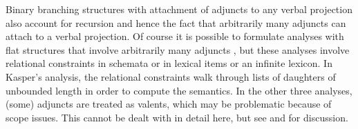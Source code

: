 \documentclass[output=paper]{langsci/langscibook}
\begin{document}
Binary branching structures with attachment of adjuncts to any verbal projection also account for recursion and hence the
fact that arbitrarily many adjuncts can attach to a verbal projection.
Of course it is possible to formulate analyses with flat structures that involve arbitrarily many
adjuncts \citep{Kasper94a,Noord94,AG2000a,BMS2001a}, but these analyses involve relational
constraints in schemata or in lexical items or an infinite lexicon. In Kasper's analysis, the
relational constraints walk through lists of daughters of unbounded length in order to compute the
semantics. In the other three analyses, (some) adjuncts are treated as valents, which may be problematic
because of scope issues. This cannot be dealt with in detail here, but see  and
 for discussion. 
\end{document}
